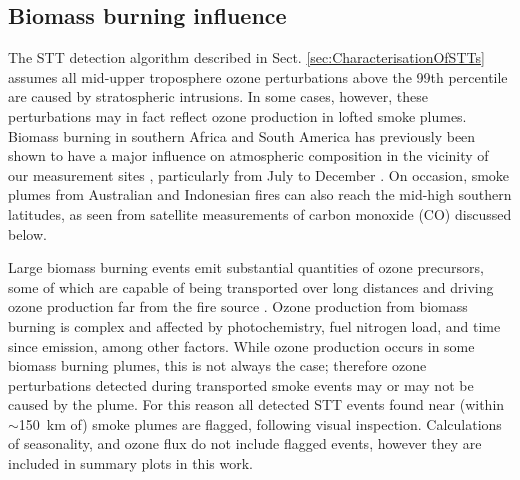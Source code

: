\documentclass[acp, manuscript]{copernicus} %
\begin{document}
  \subsection{Biomass burning influence}
  \label{sec:BiomassBurning}
    The STT detection algorithm described in Sect. \ref{sec:CharacterisationOfSTTs} assumes all mid-upper troposphere ozone perturbations above the 99th percentile are caused by stratospheric intrusions. 
    In some cases, however, these perturbations may in fact reflect ozone production in lofted smoke plumes.
    Biomass burning in southern Africa and South America has previously been shown to have a major influence on atmospheric composition in the vicinity of our measurement sites \citep{Oltmans2001, Gloudemans2006, Edwards2006}, particularly from July to December \citep{Pak2003, Liu2016}.
    On occasion, smoke plumes from Australian and Indonesian fires can also reach the mid-high southern latitudes, as seen from satellite measurements of carbon monoxide (CO) discussed below. %
    
    Large biomass burning events emit substantial quantities of ozone precursors, some of which are capable of being transported over long distances and driving ozone production far from the fire source \citep{Jaffe2012}.
    Ozone production from biomass burning is complex and affected by photochemistry, fuel nitrogen load, and time since emission, among other factors. 
    While ozone production occurs in some biomass burning plumes, this is not always the case; therefore ozone perturbations detected during transported smoke events may or may not be caused by the plume.
    For this reason all detected STT events found near (within $\sim$150~km of) smoke plumes are flagged, following visual inspection.
    Calculations of seasonality, and ozone flux do not include flagged events, however they are included in summary plots in this work.
    
    
\end{document}
